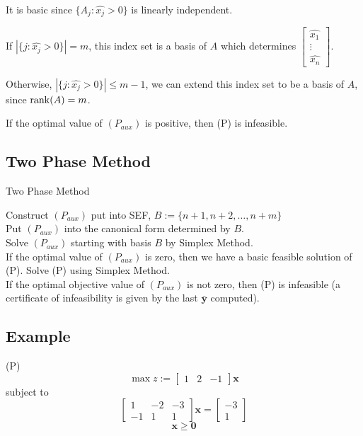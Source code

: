 It is basic since $ \{A_j : \hat{x_j}>0\} $ is linearly independent.

If $ |\{j:\hat{x_j}>0\}|=m $, this index set is a basis of $ A $ which
determines 
$ 
\begin{bmatrix}
    \hat{x_1}\\
    \vdots\\
    \hat{x_{n}}
\end{bmatrix}
$.

Otherwise, $ |\{j:\hat{x_j}>0\}|\le m-1 $, we can extend this index set
to be a basis of $ A $, since $ \operatorname{rank}(A)=m $.

If the optimal value of $ (P_{aux}) $ is positive, then (P) is
infeasible.

\subsection{Two Phase Method}
\begin{algorithm}
    \caption{Two Phase Method}
    Construct $ (P_{aux}) $ put into SEF, $ B:=\{n+1,n+2,\ldots,n+m\} $\\
    Put $ (P_{aux}) $ into the canonical form determined by $ B $.\\
    Solve $ (P_{aux}) $ starting with basis $ B $ by Simplex Method.\\
    If the optimal value of $ (P_{aux}) $ is zero, then we have a basic
    feasible solution of (P). Solve (P) using Simplex Method.\\
    If the optimal objective value of $ (P_{aux}) $ is not zero, then
    (P) is infeasible (a certificate of infeasibility is given by
    the last $ \bm{\bar{y}} $ computed).\\
\end{algorithm}

\subsection{Example}
(P)
\[ \max z:= \begin{bmatrix} 1 & 2 & -1 \end{bmatrix} \bm{x} \]
subject to
\[
    \begin{bmatrix}
        1 & -2 & -3\\
        -1 & 1 & 1
    \end{bmatrix}
    \bm{x} =
    \begin{bmatrix}
        -3\\
        1
    \end{bmatrix}
\]
\[ \bm{x}\ge \bm{0} \]

